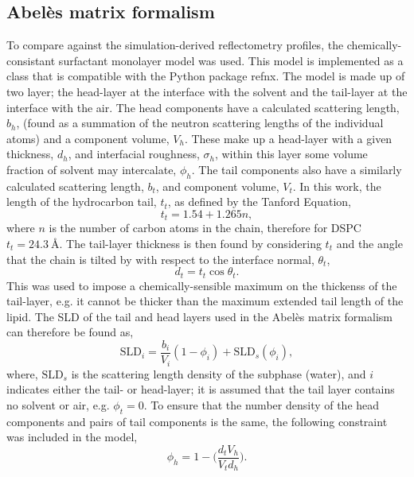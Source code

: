 \documentclass[twoside,twocolumn,9pt]{article}
\begin{document}
\subsection{Abel\`{e}s matrix formalism}
To compare against the simulation-derived reflectometry profiles, the chemically-consistant surfactant monolayer model was used.\cite{McCluskey2018,McCluskey2018a}
This model is implemented as a class that is compatible with the Python package refnx.\cite{Nelson2018,refnx}
The model is made up of two layer; the head-layer at the interface with the solvent and the tail-layer at the interface with the air.
The head components have a calculated scattering length, $b_h$, (found as a summation of the neutron scattering lengths of the individual atoms) and a component volume, $V_h$.
These make up a head-layer with a given thickness, $d_h$, and interfacial roughness, $\sigma_h$, within this layer some volume fraction of solvent may intercalate, $\phi_h$.
The tail components also have a similarly calculated scattering length, $b_t$, and component volume, $V_t$.
In this work, the length of the hydrocarbon tail, $t_t$, as defined by the Tanford Equation,\cite{Tanford1980}
%
\begin{equation}
  t_t = 1.54 + 1.265n,
\end{equation}
%
where $n$ is the number of carbon atoms in the chain, therefore for DSPC $t_t = \SI{24.3}{\angstrom}$.
The tail-layer thickness is then found by considering $t_t$ and the angle that the chain is tilted by with respect to the interface normal, $\theta_t$,
%
\begin{equation}
  d_t = t_t\cos{\theta_t}.
\end{equation}
%
This was used to impose a chemically-sensible maximum on the thickenss of the tail-layer, e.g. it cannot be thicker than the maximum extended tail length of the lipid.
The SLD of the tail and head layers used in the Abel\`{e}s matrix formalism can therefore be found as,
%
\begin{equation}
  \text{SLD}_i = \frac{b_i}{V_i}(1 - \phi_i) + \text{SLD}_s(\phi_i),
\end{equation}
%
where, $\text{SLD}_s$ is the scattering length density of the subphase (water), and $i$ indicates either the tail- or head-layer; it is assumed that the tail layer contains no solvent or air, e.g. $\phi_t = 0$.
To ensure that the number density of the head components and pairs of tail components is the same, the following constraint was included in the model,\cite{Braun2017}
%
\begin{equation}
  \phi_h = 1 - \bigg(\frac{d_tV_h}{V_td_h}\bigg).
\end{equation}
\end{document}
